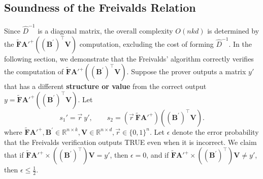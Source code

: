 \documentclass[11pt]{article}
\begin{document}
\subsection{Soundness of the Freivalds Relation}
Since $\hat{D}^{-1}$ is a diagonal matrix, the overall complexity $O(nkd)$ is determined by the $\mathbf{\tilde F{A'}^+}((\mathbf{B}^{'})^\top \mathbf{V})$ computation, excluding the cost of forming $\hat{D}^{-1}$. In the following section, we demonstrate that the Freivalds’ algorithm correctly verifies the computation of $\mathbf{\tilde F{A'}^+}((\mathbf{B}^{'})^\top \mathbf{V})$. Suppose the prover outputs a matrix $y'$ that has a different \textbf{structure or value} from the correct output $y=\mathbf{\tilde F{A'}^+}((\mathbf{B}^{'})^\top \mathbf{V})$.
Let
\[
  s_1' = \vec{r}\ y', \qquad
  s_2 = (\vec{r}\ \mathbf{\tilde F{A'}^+})((\mathbf{B}^{'})^\top \mathbf{V}).
\]
where $\mathbf{\tilde F{A'}^+},\mathbf{B}^{'} \in \mathbb{R}^{n\times k}, \mathbf{V} \in \mathbb{R}^{n\times d}, \vec{r} \in \{0,1\}^n$.
Let $\epsilon$ denote the error probability that the Freivalds verification outputs TRUE even when it is incorrect. We claim that if $\mathbf{\tilde F{A'}^+} \times ((\mathbf{B}^{'})^\top)\mathbf{V} = y'$, then $\epsilon = 0$, and if $\mathbf{\tilde F{A'}^+} \times ((\mathbf{B}^{'})^\top)\mathbf{V} \neq y'$, then $\epsilon \leq \frac{1}{2}$.
\end{document}

